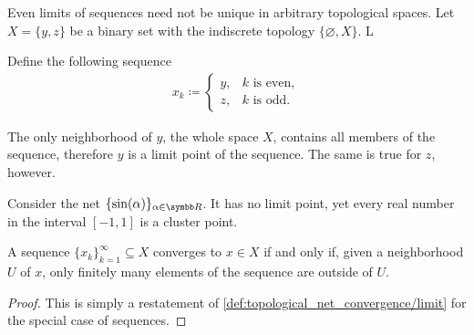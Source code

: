 \begin{example}\label{ex:multiple_limit_points_of_net}
  Even limits of sequences need not be unique in arbitrary topological spaces. Let \( X = \{ y, z \} \) be a binary set with the indiscrete topology \( \{ \varnothing, X \} \). L

  Define the following sequence
  \begin{align*}
    x_k \coloneqq \begin{cases}
      y, &k \text{ is even}, \\
      z, &k \text{ is odd}.
    \end{cases}
  \end{align*}

  The only neighborhood of \( y \), the whole space \( X \), contains all members of the sequence, therefore \( y \) is a limit point of the sequence. The same is true for \( z \), however.
\end{example}

\begin{example}\label{ex:cluster_points/sine}
  Consider the net \( \{ \sin(\al) \}_{\al \in \BR} \). It has no limit point, yet every real number in the interval \( [-1, 1] \) is a cluster point.
\end{example}

\begin{proposition}\label{thm:sequence_converges_iff_almost_entirely_in_neighborhood}
  A sequence \( \{ x_k \}_{k=1}^\infty \subseteq X \) converges to \( x \in X \) if and only if, given a neighborhood \( U \) of \( x \), only finitely many elements of the sequence are outside of \( U \).
\end{proposition}
\begin{proof}
  This is simply a restatement of \cref{def:topological_net_convergence/limit} for the special case of sequences.
\end{proof}

